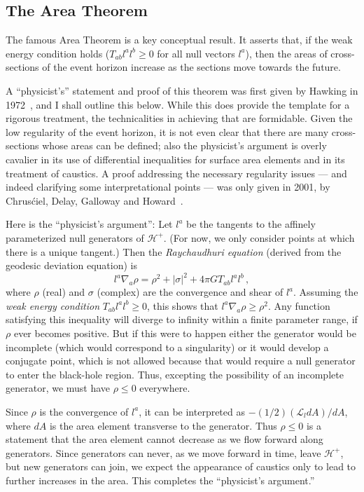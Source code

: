 \documentclass[
%
draft    %
,numberedheadings 
,bibliocites
  ]
  {aipproc}
\newcommand{\Hf}{{{\mathscr H}^{+}}} %
\newcommand{\Lie}{{\mathcal L}}
\begin{document}
\subsection{The Area Theorem}

The famous Area Theorem is a key conceptual result.
It asserts that, if the weak energy condition holds ($T_{ab}l^al^b\geq 0$ for all null vectors $l^a$), then the areas of cross-sections of the event horizon increase as the sections move towards the future.

A ``physicist's'' statement and proof of this theorem was first given by Hawking in 1972~\citep{Hawking:1971vc}, and I shall outline this below.  While this does provide the template for a rigorous treatment, the technicalities in achieving that are formidable.  Given the low regularity of the event horizon, it is not even clear that there are many cross-sections whose areas can be defined; also the physicist's argument is overly cavalier in its use of differential inequalities for surface area elements and in its treatment of caustics.  
A proof addressing the necessary regularity issues --- and indeed clarifying some interpretational points --- was only given in 2001, by Chrus\'ciel, Delay, Galloway and Howard~\citep{Chrusciel:2001}.

Here is the ``physicist's argument'':  Let $l^a$ be the tangents to the affinely parameterized null generators of $\Hf$.  (For now, we only consider points at which there is a unique tangent.)  Then the {\em Raychaudhuri equation} (derived from the geodesic deviation equation) is
\begin{equation}
l^a\nabla _a\rho =\rho ^2+|\sigma |^2 +4\pi G T_{ab}l^al^b\, ,
\end{equation}
where $\rho$ (real) and $\sigma$ (complex) are the convergence and shear of $l^a$.  
Assuming the {\em weak energy condition} $T_{ab}l^al^b\geq 0$,
this shows that $l^a\nabla _a\rho\geq \rho ^2$.  
Any function satisfying this inequality will diverge to infinity within a finite parameter range, if 
$\rho$ ever becomes positive. 
But if this were to happen either the generator would be incomplete (which would correspond to a singularity) or it would develop a conjugate point, which is not allowed because that would require a null generator to enter the black-hole region.  Thus, excepting the possibility of an incomplete generator, we must have $\rho\leq 0$ everywhere.

Since $\rho$ is the convergence of $l^a$, it can be interpreted as $-(1/2)(\Lie _l dA)/dA$, where $dA$ is the area element transverse to the generator.  Thus $\rho \leq 0$ is a statement that the area element cannot decrease as we flow forward along generators.  Since generators can never, as we move forward in time, leave $\Hf$, but new generators can join, we expect the appearance of caustics only to lead to further increases in the area. This completes the ``physicist's argument.''
\end{document}
